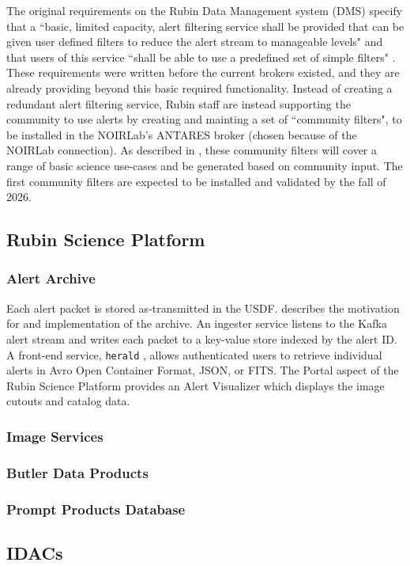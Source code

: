 The original requirements on the Rubin Data Management system (DMS) specify that a ``basic, limited capacity, alert filtering service shall be provided that can be given user defined filters to reduce the alert stream to manageable levels" and that users of this service ``shall be able to use a predefined set of simple filters" \citep{LSE-61}.
These requirements were written before the current brokers existed, and they are already providing beyond this basic required functionality.
Instead of creating a redundant alert filtering service, Rubin staff are instead supporting the community to use alerts by creating and mainting a set of ``community filters", to be installed in the NOIRLab's ANTARES broker (chosen because of the NOIRLab connection).
As described in \citet{RTN-090}, these community filters will cover a range of basic science use-cases and be generated based on community input.
The first community filters are expected to be installed and validated by the fall of 2026.

\subsection{Rubin Science Platform}


\subsubsection{Alert Archive}

Each alert packet is stored as-transmitted in the USDF.
\citet{DMTN-183} describes the motivation for and implementation of the archive.
An ingester service listens to the Kafka alert stream and writes each packet to a key-value store indexed by the alert ID.
A front-end service, \texttt{herald} \citep{SQR-114}, allows authenticated users to retrieve individual alerts in Avro Open Container Format, JSON, or FITS.
The Portal aspect of the Rubin Science Platform provides an Alert Visualizer which displays the image cutouts and catalog data.

\subsubsection{Image Services}

\subsubsection{Butler Data Products}

\subsubsection{Prompt Products Database} \label{sec:ppdb}

\subsection{IDACs}

